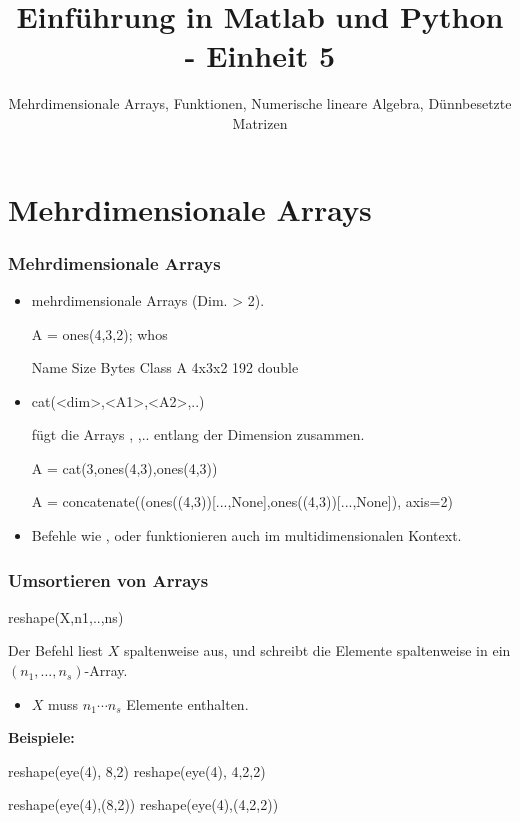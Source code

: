 \documentclass[hyperref={xetex}]{beamer}
\title{Einführung in Matlab und Python - Einheit 5}
\subtitle{Mehrdimensionale Arrays, Funktionen, Numerische lineare Algebra, Dünnbesetzte Matrizen}
\begin{document}
\titlepage

\section{Mehrdimensionale Arrays}
%
%
%
\begin{frame}[fragile]\frametitle{Mehrdimensionale Arrays}
\begin{itemize}
\item mehrdimensionale Arrays (Dim. > 2).
\begin{matlabin}
A = ones(4,3,2);
whos
\end{matlabin}
\begin{matlab}
  Name   Size   Bytes  Class  
  A      4x3x2    192  double  
\end{matlab}
\item 
\begin{matlabin}
cat(<dim>,<A1>,<A2>,..) 
\end{matlabin}
f\"ugt die Arrays , ,.. entlang der Dimension  zusammen. 
\begin{matlabin}
A = cat(3,ones(4,3),ones(4,3))
\end{matlabin}
\begin{pyin}
A = concatenate((ones((4,3))[...,None],ones((4,3))[...,None]), axis=2)
\end{pyin}
\item Befehle wie \alert{ }, \alert{ } oder \alert{
  } funktionieren auch im multidimensionalen Kontext.
\end{itemize}
\end{frame}
%
%
\begin{frame}[fragile]\frametitle{Umsortieren von Arrays}
\begin{matlabin}
reshape(X,n1,..,ns)
\end{matlabin}
Der Befehl liest $X$ spaltenweise
aus, und schreibt die Elemente spaltenweise in ein $(n_1, \dots,
n_s)$-Array. 
\begin{itemize}
\item $X$ muss $n_1 \cdots n_s$ Elemente enthalten.
\end{itemize}
\textbf{Beispiele:}
\begin{matlabin}
reshape(eye(4), 8,2)
reshape(eye(4), 4,2,2)
\end{matlabin}
\begin{pyin}
reshape(eye(4),(8,2))
reshape(eye(4),(4,2,2))
\end{pyin}
\end{frame}
\end{document}
